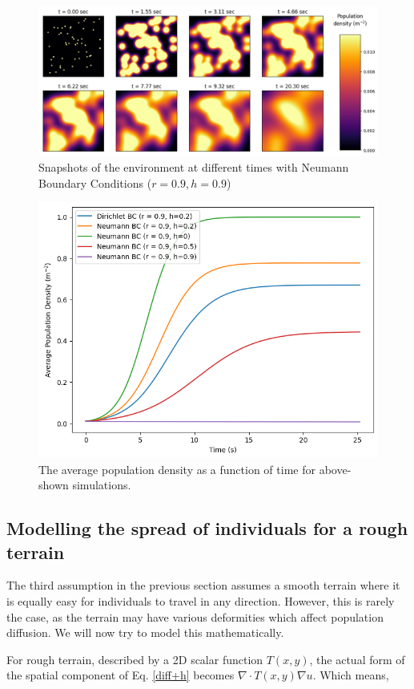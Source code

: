 \begin{figure}[H]
    \centering
    \includegraphics[width=1\linewidth]{Figures/5/5b/neumann_h9.png}
    \caption{Snapshots of the environment at different times with Neumann Boundary Conditions ($r=0.9,h=0.9$)}
\end{figure}

\begin{figure}[H]
    \centering
    \includegraphics[width=0.6\linewidth]{Figures/5/5b/densities.png}
    \caption{The average population density as a function of time for above-shown simulations.}
\end{figure}

\subsection{Modelling the spread of individuals for a rough terrain}
The third assumption in the previous section assumes a smooth terrain where it is equally easy for individuals to travel in any direction. However, this is rarely the case, as the terrain may have various deformities which affect population diffusion. We will now try to model this mathematically.

For rough terrain, described by a 2D scalar function $T(x, y)$, the actual form of the spatial component of Eq. \ref{diff+h} becomes $\nabla \cdot T(x, y) \nabla u$. Which means,

